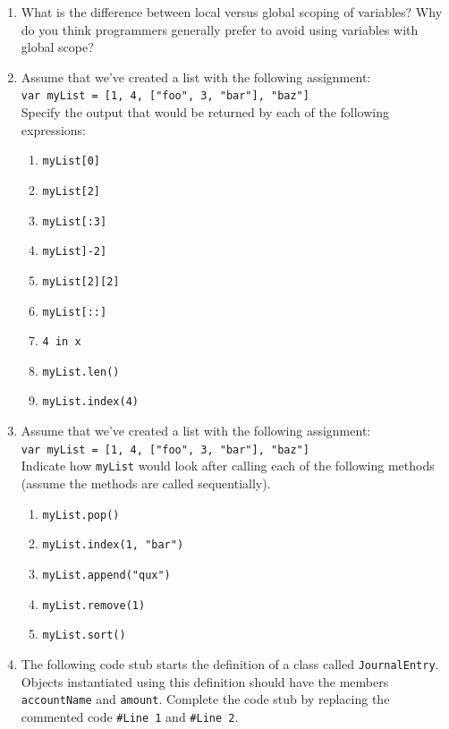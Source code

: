 \documentclass{book}
\begin{document}
\begin{enumerate}
		\item What is the difference between local versus global scoping of variables? Why do you think programmers generally prefer to avoid using variables with global scope?
	\item Assume that we've created a list with the following assignment: \\ \texttt{var myList = [1, 4, ["foo", 3, "bar"], "baz"]}
	\\Specify the output that would be returned by each of the following expressions:
	\begin{enumerate}
		\item \texttt{myList[0]}
		\item \texttt{myList[2]}
		\item \texttt{myList[:3]}
		\item \texttt{myList]-2]}
		\item \texttt{myList[2][2]}
		\item \texttt{myList[::]}
		\item \texttt{4 in x}	
		\item \texttt{myList.len()}
		\item \texttt{myList.index(4)}
	\end{enumerate}
	\item Assume that we've created a list with the following assignment: \\ \texttt{var myList = [1, 4, ["foo", 3, "bar"], "baz"]}
	\\Indicate how \texttt{myList} would look after calling each of the following methods (assume the methods are called sequentially).
	\begin{enumerate}
		\item \texttt{myList.pop()}
		\item \texttt{myList.index(1, "bar")}
		\item \texttt{myList.append("qux")}
		\item \texttt{myList.remove(1)}
		\item \texttt{myList.sort()}
	\end{enumerate}
	\item The following code stub starts the definition of a class called \texttt{JournalEntry}. Objects instantiated using this definition should have the members \\ \texttt{accountName} and \texttt{amount}. Complete the code stub by replacing the commented code \texttt{\#Line 1} and \texttt{\#Line 2}.
	

\end{enumerate}
\end{document}
